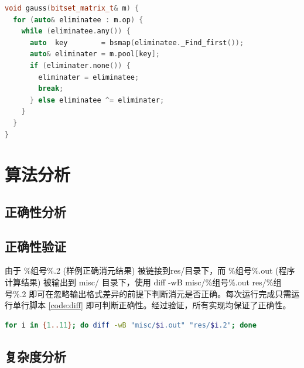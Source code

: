 \documentclass[a4paper]{article}
\begin{document}
\begin{lstlisting}[frame=trbl, language={C++}, caption={位元矩阵消元部分}]
void gauss(bitset_matrix_t& m) {
  for (auto& eliminatee : m.op) {
    while (eliminatee.any()) {
      auto  key        = bsmap(eliminatee._Find_first());
      auto& eliminater = m.pool[key];
      if (eliminater.none()) {
        eliminater = eliminatee;
        break;
      } else eliminatee ^= eliminater;
    }
  }
}
\end{lstlisting}

\section{算法分析}
\subsection{正确性分析}

\subsection{正确性验证}
由于 \%组号\%.2 (样例正确消元结果) 被链接到res/目录下，而 \%组号\%.out (程序计算结果) 被输出到 misc/ 目录下，使用 diff -wB misc/\%组号\%.out res/\%组号\%.2 即可在忽略输出格式差异的前提下判断消元是否正确。每次运行完成只需运行单行脚本 \ref{code:diff} 即可判断正确性。经过验证，所有实现均保证了正确性。
\begin{lstlisting}[frame=trbl, language={bash}, caption={单行 Bash 脚本}, label = {code:diff}]
  for i in {1..11}; do diff -wB "misc/$i.out" "res/$i.2"; done
\end{lstlisting}

\subsection{复杂度分析}
\end{document}
